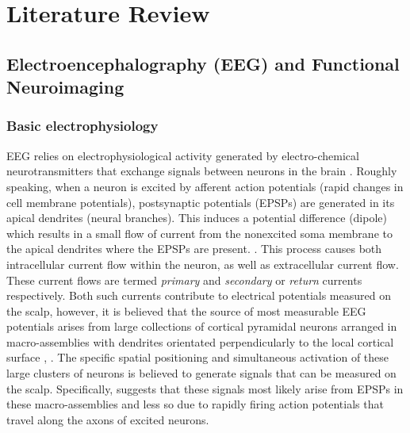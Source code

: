 \chapter{Literature Review}
\label{chapter:lit-review}

\graphicspath{ {report/C2 Literature Review/assets/} } 

\section{Electroencephalography (EEG) and Functional Neuroimaging}

\subsection{Basic electrophysiology}
EEG relies on electrophysiological activity generated by electro-chemical neurotransmitters that exchange signals between neurons in the brain \cite{bci-survey-nicolas-alonso}. Roughly speaking, when a neuron is excited by afferent action potentials (rapid changes in cell membrane potentials), postsynaptic potentials (EPSPs) are generated in its apical dendrites \cite{baillet-em-brain-mapping} (neural branches). This induces a potential difference (dipole) which results in a small flow of current from the nonexcited soma membrane to the apical dendrites where the EPSPs are present. \cite{baillet-em-brain-mapping}. This process causes both intracellular current flow within the neuron, as well as extracellular current flow. These current flows are termed \textit{primary} and \textit{secondary} or \textit{return} currents respectively. Both such currents contribute to electrical potentials measured on the scalp, however, it is believed that the source of most measurable EEG potentials arises from large collections of cortical pyramidal neurons arranged in macro-assemblies with dendrites orientated perpendicularly to the local cortical surface \cite{baillet-em-brain-mapping}, \cite{teplan-eeg-measurement}. The specific spatial positioning and simultaneous activation of these large clusters of neurons is believed to generate signals that can be measured on the scalp. Specifically, \cite{baillet-em-brain-mapping} suggests that these signals most likely arise from EPSPs in these macro-assemblies and less so due to rapidly firing action potentials that travel along the axons of excited neurons.

